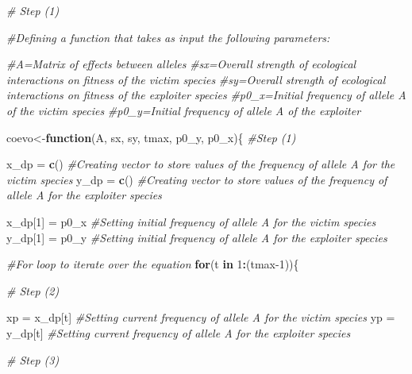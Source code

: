 \documentclass[
]{book}
\newenvironment{Shaded}{\begin{snugshade}}{\end{snugshade}}
\newcommand{\CommentTok}[1]{\textcolor[rgb]{0.56,0.35,0.01}{\textit{#1}}}
\newcommand{\ControlFlowTok}[1]{\textcolor[rgb]{0.13,0.29,0.53}{\textbf{#1}}}
\newcommand{\DecValTok}[1]{\textcolor[rgb]{0.00,0.00,0.81}{#1}}
\newcommand{\FunctionTok}[1]{\textcolor[rgb]{0.13,0.29,0.53}{\textbf{#1}}}
\newcommand{\NormalTok}[1]{#1}
\newcommand{\OtherTok}[1]{\textcolor[rgb]{0.56,0.35,0.01}{#1}}
\newcommand{\SpecialCharTok}[1]{\textcolor[rgb]{0.81,0.36,0.00}{\textbf{#1}}}
\begin{document}
\begin{Shaded}
\begin{Highlighting}[]
\CommentTok{\# Step (1)}

\CommentTok{\#Defining a function that takes as input the following parameters:}

\CommentTok{\#A=Matrix of effects between alleles}
\CommentTok{\#sx=Overall strength of ecological interactions on fitness of the victim species}
\CommentTok{\#sy=Overall strength of ecological interactions on fitness of the exploiter species}
\CommentTok{\#p0\_x=Initial frequency of allele A of the victim species}
\CommentTok{\#p0\_y=Initial frequency of allele A of the exploiter}

\NormalTok{coevo}\OtherTok{\textless{}{-}}\ControlFlowTok{function}\NormalTok{(A, sx, sy, tmax, p0\_y, p0\_x)\{ }\CommentTok{\#Step (1)}
  
\NormalTok{x\_dp }\OtherTok{=} \FunctionTok{c}\NormalTok{() }\CommentTok{\#Creating vector to store values of the frequency of allele A for the victim species}
\NormalTok{y\_dp }\OtherTok{=} \FunctionTok{c}\NormalTok{() }\CommentTok{\#Creating vector to store values of the frequency of allele A for the exploiter species}

\NormalTok{x\_dp[}\DecValTok{1}\NormalTok{] }\OtherTok{=}\NormalTok{ p0\_x }\CommentTok{\#Setting initial frequency of allele A for the victim species}
\NormalTok{y\_dp[}\DecValTok{1}\NormalTok{] }\OtherTok{=}\NormalTok{ p0\_y }\CommentTok{\#Setting initial frequency of allele A for the exploiter species}

\CommentTok{\#For loop to iterate over the equation}
\ControlFlowTok{for}\NormalTok{(t }\ControlFlowTok{in} \DecValTok{1}\SpecialCharTok{:}\NormalTok{(tmax}\DecValTok{{-}1}\NormalTok{))\{}
  
  \CommentTok{\# Step (2)}
  
\NormalTok{  xp }\OtherTok{=}\NormalTok{ x\_dp[t] }\CommentTok{\#Setting current frequency of allele A for the victim species}
\NormalTok{  yp }\OtherTok{=}\NormalTok{ y\_dp[t] }\CommentTok{\#Setting current frequency of allele A for the exploiter species}
  
  \CommentTok{\# Step (3)}


\end{Highlighting}
\end{Shaded}
\end{document}
